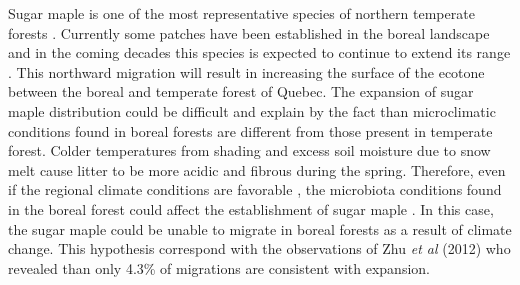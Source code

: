 Sugar maple is one of the most representative species of northern temperate forests \cite{Graignic2013,Messaoud2007,Kellman2004}. Currently some patches have been established in the boreal landscape  and in the coming decades this species is expected to continue to extend its range \cite{Graignic2013,Goldblum2005,Woodall2009}. This northward migration will result in increasing the surface of the ecotone between the boreal and temperate forest of Quebec. The expansion of sugar maple distribution could be difficult and explain by the fact than microclimatic conditions found in boreal forests are different from those present in temperate forest. Colder temperatures from shading and excess soil moisture due to snow melt cause litter to be more acidic and fibrous during the spring. Therefore, even if the regional climate conditions are favorable \cite{Kellman2004}, the microbiota conditions found in the boreal forest could affect the establishment of sugar maple \cite{Kellman2004,Moore2008,DeFrenne2013}. In this case, the sugar maple could be unable to migrate in boreal forests as a result of climate change. This hypothesis correspond with the observations of Zhu \emph{et al} (2012) who revealed than only 4.3\% of migrations are consistent with expansion\cite{Zhu2012}.\\


